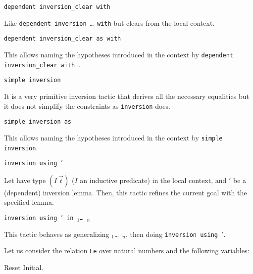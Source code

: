 \begin{coq_example*}
\begin{Variants}
\item {}
  \texttt{dependent inversion\_clear {\ident} with \term}

  Like \texttt{dependent inversion \dots\ with} but clears {\ident} from
  the local context.

\item {}
  \texttt{dependent inversion\_clear {\ident} as
  {\intropattern} with \term}

  This allows naming the hypotheses introduced in the context by
  \texttt{dependent inversion\_clear {\ident} with \term}.

\item {} \texttt{simple inversion \ident}

  It is a very primitive inversion tactic that derives all the necessary
  equalities  but it does not simplify the  constraints as
  \texttt{inversion} does.

\item {} \texttt{simple inversion
  {\ident} as \intropattern}

  This allows naming the hypotheses introduced in the context by
  \texttt{simple inversion}.

\item {} \texttt{inversion {\ident}
  using \ident$'$}

  Let {\ident} have type $(I~\vec{t})$ ($I$ an inductive
  predicate) in the local context, and \ident$'$ be a (dependent) inversion
  lemma. Then, this tactic refines the current goal with the specified
  lemma.

\item {} \texttt{inversion
  {\ident} using \ident$'$ in \ident$_1$\dots\ \ident$_n$}

  This tactic behaves as generalizing \ident$_1$\dots\ \ident$_n$,
  then doing \texttt{inversion {\ident} using \ident$'$}.

\end{Variants}

\firstexample
{}
\label{inversion-examples}

Let us consider the relation \texttt{Le} over natural numbers and the
following variables:

\begin{coq_eval}
Reset Initial.
\end{coq_eval}


\end{coq_example*}
